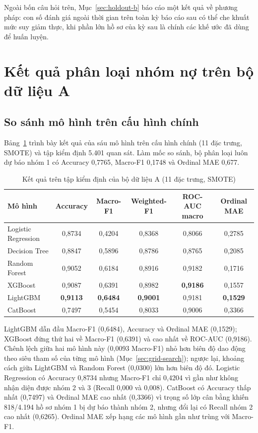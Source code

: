 Ngoài bốn câu hỏi trên, Mục~\ref{sec:holdout-b} báo cáo một kết quả về phương pháp: con số đánh giá ngoài thời gian trên toàn kỳ báo cáo sau có thể che khuất mức suy giảm thực, khi phần lớn hồ sơ của kỳ sau là chính các khế ước đã dùng để huấn luyện.

\section{Kết quả phân loại nhóm nợ trên bộ dữ liệu A}

\subsection{So sánh mô hình trên cấu hình chính}
\label{sec:res-a-models}

Bảng~\ref{tab:dataset-a-model-results} trình bày kết quả của sáu mô hình trên cấu hình chính (11 đặc trưng, SMOTE) và tập kiểm định 5.401 quan sát. Làm mốc so sánh, bộ phân loại luôn dự báo nhóm 1 có Accuracy 0,7765, Macro-F1 0,1748 và Ordinal MAE 0,677.

\begin{table}[H]
\centering
\caption{Kết quả trên tập kiểm định của bộ dữ liệu A (11 đặc trưng, SMOTE)}
\label{tab:dataset-a-model-results}
\begin{tabular}{|l|c|c|c|c|c|}
\hline
Mô hình & Accuracy & Macro-F1 & Weighted-F1 & ROC-AUC macro & Ordinal MAE\\
\hline
Logistic Regression & 0,8734 & 0,4204 & 0,8368 & 0,8066 & 0,2785\\
Decision Tree & 0,8847 & 0,5896 & 0,8786 & 0,8765 & 0,2085\\
Random Forest & 0,9052 & 0,6184 & 0,8916 & 0,9182 & 0,1716\\
XGBoost & 0,9087 & 0,6391 & 0,8982 & \textbf{0,9186} & 0,1557\\
LightGBM & \textbf{0,9113} & \textbf{0,6484} & \textbf{0,9001} & 0,9181 & \textbf{0,1529}\\
CatBoost & 0,7497 & 0,5454 & 0,8033 & 0,9006 & 0,3366\\
\hline
\end{tabular}
\end{table}

LightGBM dẫn đầu Macro-F1 (0,6484), Accuracy và Ordinal MAE (0,1529); XGBoost đứng thứ hai về Macro-F1 (0,6391) và cao nhất về ROC-AUC (0,9186). Chênh lệch giữa hai mô hình này (0,0093 Macro-F1) nhỏ hơn biên độ dao động theo siêu tham số của từng mô hình (Mục~\ref{sec:grid-search}); ngược lại, khoảng cách giữa LightGBM và Random Forest (0,0300) lớn hơn biên độ đó. Logistic Regression có Accuracy 0,8734 nhưng Macro-F1 chỉ 0,4204 vì gần như không nhận diện được nhóm 2 và 3 (Recall 0,000 và 0,008). CatBoost có Accuracy thấp nhất (0,7497) và Ordinal MAE cao nhất (0,3366) vì trọng số lớp cân bằng khiến 818/4.194 hồ sơ nhóm 1 bị dự báo thành nhóm 2, nhưng đổi lại có Recall nhóm 2 cao nhất (0,6265). Ordinal MAE xếp hạng các mô hình gần như trùng với Macro-F1.

